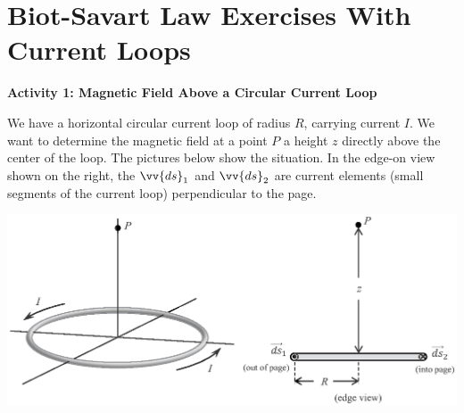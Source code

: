 \section{Biot-Savart Law Exercises With Current Loops}

\makelabheader %

\bigskip

\textbf{Activity 1: Magnetic Field Above a Circular Current Loop}

We have a horizontal 
circular current loop of radius $R$, carrying
current $I$.  We want to determine the magnetic field at a point $P$ a
height $z$ directly above the center of the loop.
The pictures below show the situation.  In the edge-on view shown on the right, 
the $\vv{ds}_1$ and $\vv{ds}_2$ are current elements (small segments of the current loop) perpendicular
to the page.

\vskip 0.4in
\begin{center}
\includegraphics{biot_savart_above_loops/circular_loop_3d.eps}
\end{center}

